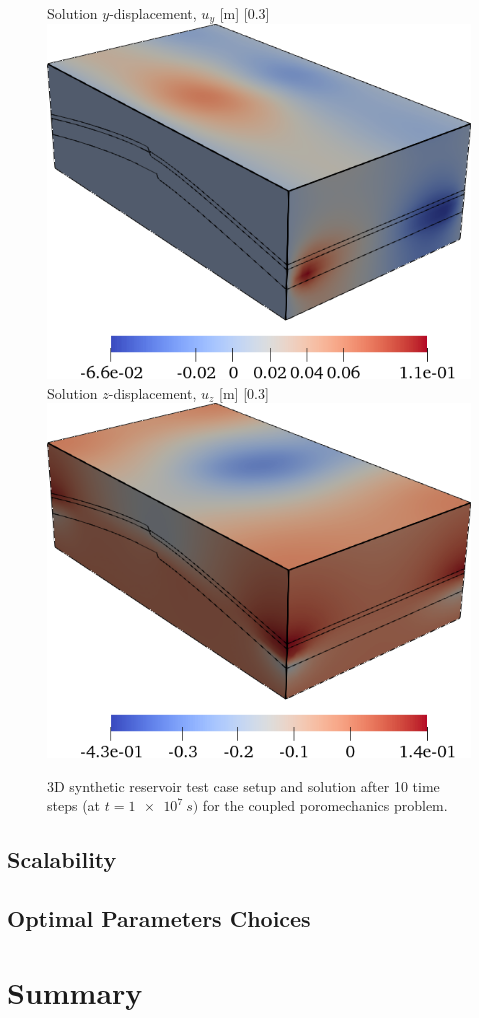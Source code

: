 \begin{figure} [htbp]
    {
        Solution $y$-displacement, $u_y$ [\unit{m}]
        \label{fig:mazumodel2_geosx_sol_y}
    }
    [0.3\textwidth]
    {
        \includegraphics[width=\linewidth]{figs/MazuModel2/geosx/poro_sol_y}
    }
    \hfill
    \subcaptionbox
    {
        Solution $z$-displacement, $u_z$ [\unit{m}]
        \label{fig:mazumodel2_geosx_sol_z}
    }
    [0.3\textwidth]
    {
        \includegraphics[width=\linewidth]{figs/MazuModel2/geosx/poro_sol_z}
    }
    \caption[3D synthetic reservoir test case setup]{3D synthetic reservoir test case setup and solution after 10 time steps (at $t = \qty{1e7}{s})$ for the coupled poromechanics problem.}
    \label{fig:mazumodel2_geosx_setup}
\end{figure}

\subsection{Scalability}



\subsection{Optimal Parameters Choices}

\section{Summary}
\label{sec:par_summary}